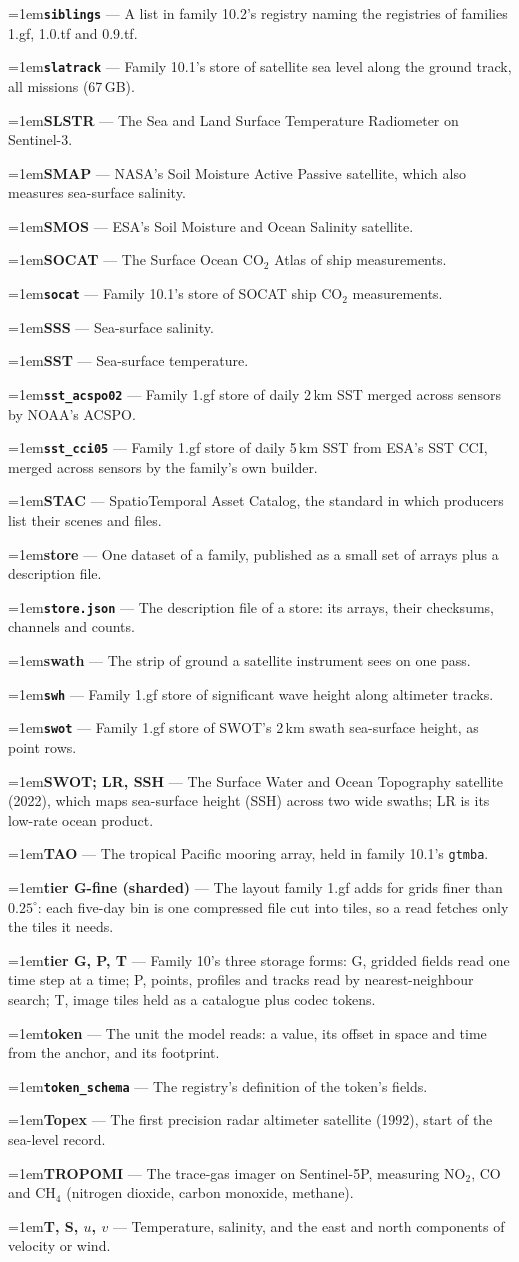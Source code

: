 \documentclass[10pt]{article}
\newcommand{\code}[1]{\texttt{#1}}
\newcommand{\gl}[2]{\par\hangindent=1em\hangafter=1\textbf{#1} --- #2\par}
\begin{document}
\gl{\code{siblings}}{A list in family 10.2's registry naming the registries of families 1.gf, 1.0.tf and 0.9.tf.}
\gl{\code{slatrack}}{Family 10.1's store of satellite sea level along the ground track, all missions (67\,GB).}
\gl{SLSTR}{The Sea and Land Surface Temperature Radiometer on Sentinel-3.}
\gl{SMAP}{NASA's Soil Moisture Active Passive satellite, which also measures sea-surface salinity.}
\gl{SMOS}{ESA's Soil Moisture and Ocean Salinity satellite.}
\gl{SOCAT}{The Surface Ocean CO$_2$ Atlas of ship measurements.}
\gl{\code{socat}}{Family 10.1's store of SOCAT ship CO$_2$ measurements.}
\gl{SSS}{Sea-surface salinity.}
\gl{SST}{Sea-surface temperature.}
\gl{\code{sst\_acspo02}}{Family 1.gf store of daily 2\,km SST merged across sensors by NOAA's ACSPO.}
\gl{\code{sst\_cci05}}{Family 1.gf store of daily 5\,km SST from ESA's SST CCI, merged across sensors by the family's own builder.}
\gl{STAC}{SpatioTemporal Asset Catalog, the standard in which producers list their scenes and files.}
\gl{store}{One dataset of a family, published as a small set of arrays plus a description file.}
\gl{\code{store.json}}{The description file of a store: its arrays, their checksums, channels and counts.}
\gl{swath}{The strip of ground a satellite instrument sees on one pass.}
\gl{\code{swh}}{Family 1.gf store of significant wave height along altimeter tracks.}
\gl{\code{swot}}{Family 1.gf store of SWOT's 2\,km swath sea-surface height, as point rows.}
\gl{SWOT; LR, SSH}{The Surface Water and Ocean Topography satellite (2022), which maps sea-surface height (SSH) across two wide swaths; LR is its low-rate ocean product.}
\gl{TAO}{The tropical Pacific mooring array, held in family 10.1's \code{gtmba}.}
\gl{tier G-fine (sharded)}{The layout family 1.gf adds for grids finer than $0.25^\circ$: each five-day bin is one compressed file cut into tiles, so a read fetches only the tiles it needs.}
\gl{tier G, P, T}{Family 10's three storage forms: G, gridded fields read one time step at a time; P, points, profiles and tracks read by nearest-neighbour search; T, image tiles held as a catalogue plus codec tokens.}
\gl{token}{The unit the model reads: a value, its offset in space and time from the anchor, and its footprint.}
\gl{\code{token\_schema}}{The registry's definition of the token's fields.}
\gl{Topex}{The first precision radar altimeter satellite (1992), start of the sea-level record.}
\gl{TROPOMI}{The trace-gas imager on Sentinel-5P, measuring NO$_2$, CO and CH$_4$ (nitrogen dioxide, carbon monoxide, methane).}
\gl{T, S, $u$, $v$}{Temperature, salinity, and the east and north components of velocity or wind.}
\end{document}
